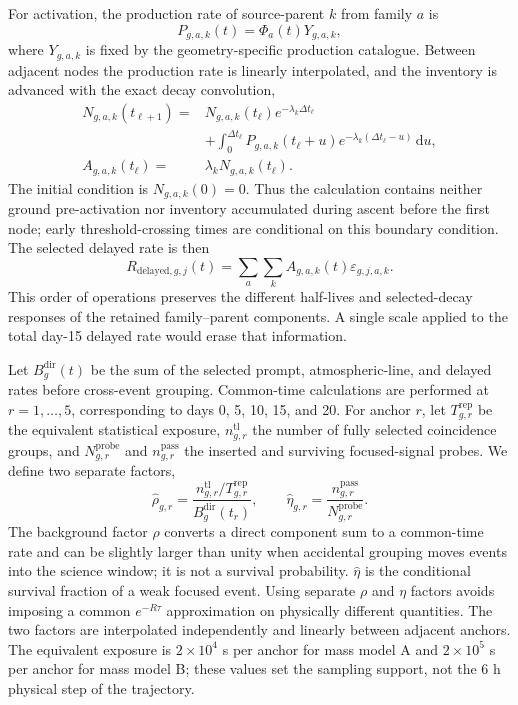 \documentclass[11pt]{article}
\begin{document}
For activation, the production rate of source-parent $k$ from family $a$ is
\begin{equation}
 P_{g,a,k}(t)=\Phi_a(t)Y_{g,a,k},
 \label{eq:activation_production}
\end{equation}
where $Y_{g,a,k}$ is fixed by the geometry-specific production catalogue. Between
adjacent nodes the production rate is linearly interpolated, and the inventory
is advanced with the exact decay convolution,
\begin{equation}
 \begin{aligned}
 N_{g,a,k}(t_{\ell+1})={}&N_{g,a,k}(t_\ell)e^{-\lambda_k\Delta t_\ell}\\
 &+\int_0^{\Delta t_\ell}P_{g,a,k}(t_\ell+u)
 e^{-\lambda_k(\Delta t_\ell-u)}\,\mathrm du,\\
 A_{g,a,k}(t_\ell)={}&\lambda_kN_{g,a,k}(t_\ell).
 \end{aligned}
 \label{eq:delayed_inventory}
\end{equation}
The initial condition is $N_{g,a,k}(0)=0$. Thus the calculation contains neither
ground pre-activation nor inventory accumulated during ascent before the first
node; early threshold-crossing times are conditional on this boundary condition.
The selected delayed rate is then
\begin{equation}
 R_{\mathrm{delayed},g,j}(t)=
 \sum_a\sum_k A_{g,a,k}(t)\varepsilon_{g,j,a,k}.
 \label{eq:delayed_selected}
\end{equation}
This order of operations preserves the different half-lives and selected-decay
responses of the retained family--parent components. A single scale applied to
the total day-15 delayed rate would erase that information.

Let $B^{\mathrm{dir}}_g(t)$ be the sum of the selected prompt, atmospheric-line,
and delayed rates before cross-event grouping. Common-time calculations are
performed at $r=1,\ldots,5$, corresponding to days 0, 5, 10, 15, and 20. For
anchor $r$, let $T^{\mathrm{rep}}_{g,r}$ be the equivalent statistical exposure,
$n^{\mathrm{tl}}_{g,r}$ the number of fully selected coincidence groups, and
$N^{\mathrm{probe}}_{g,r}$ and $n^{\mathrm{pass}}_{g,r}$ the inserted and
surviving focused-signal probes. We define two separate factors,
\begin{equation}
 \widehat\rho_{g,r}=
 \frac{n^{\mathrm{tl}}_{g,r}/T^{\mathrm{rep}}_{g,r}}
 {B^{\mathrm{dir}}_g(t_r)},\qquad
 \widehat\eta_{g,r}=
 \frac{n^{\mathrm{pass}}_{g,r}}{N^{\mathrm{probe}}_{g,r}}.
 \label{eq:anchor_time_factors}
\end{equation}
The background factor $\widehat\rho$ converts a direct component sum to a
common-time rate and can be slightly larger than unity when accidental grouping
moves events into the science window; it is not a survival probability.
$\widehat\eta$ is the conditional survival fraction of a weak focused event.
Using separate $\rho$ and $\eta$ factors avoids imposing a common
$e^{-R\tau}$ approximation on physically different quantities. The two factors
are interpolated independently and linearly between adjacent anchors. The
equivalent exposure is $2\times10^4$ s per anchor for mass model A and
$2\times10^5$ s per anchor for mass model B; these values set the sampling
support, not the 6 h physical step of the trajectory.
\end{document}

